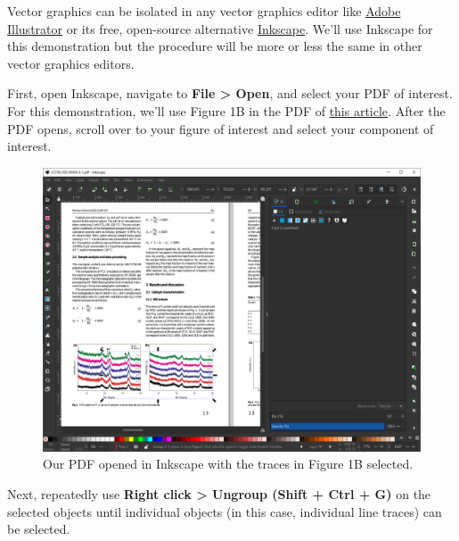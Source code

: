 \documentclass[letterpaper, 12pt]{article}
\begin{document}
Vector graphics can be isolated in any vector graphics editor like \href{https://www.adobe.com/products/illustrator.html}{Adobe Illustrator} or its free, open-source alternative \href{https://inkscape.org/}{Inkscape}. We'll use Inkscape for this demonstration but the procedure will be more or less the same in other vector graphics editors.

First, open Inkscape, navigate to \textbf{File > Open}, and select your PDF of interest. For this demonstration, we'll use Figure 1B in the PDF of \href{https://doi.org/10.1007/s12182-020-00439-9}{this article}. After the PDF opens, scroll over to your figure of interest and select your component of interest.

\begin{figure}[h!tbp]
    \includegraphics[width=\textwidth]{img/vector/in_inkscape.png}
    \caption*{Our PDF opened in Inkscape with the traces in Figure 1B selected.}
\end{figure}

\pagebreak
Next, repeatedly use \textbf{Right click > Ungroup (Shift + Ctrl + G)} on the selected objects until individual objects (in this case, individual line traces) can be selected.
\end{document}
